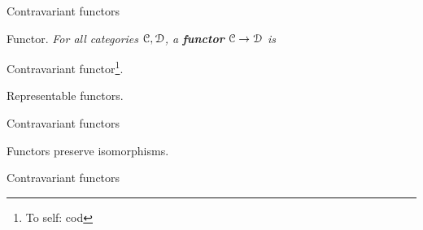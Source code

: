 \begin{frame}[t]{Contravariant functors} %

  \par{} Functor. \textit{For all categories $\mathcal{C}, \mathcal{D}$, a \textbf{functor} $\mathcal{C} \to \mathcal{D}$ is}
  \vspace{5\baselineskip}
  \par{} Contravariant functor\footnote{To self: cod}.
  \vspace{5\baselineskip}
  \par{} Representable functors.
  
\end{frame}

\begin{frame}[t]{Contravariant functors} %

  \par{} Functors preserve isomorphisms.
  \vspace{10\baselineskip}
  \par{}
  
\end{frame}

\begin{frame}[t]{Contravariant functors} %

  \par{}
  
\end{frame}
